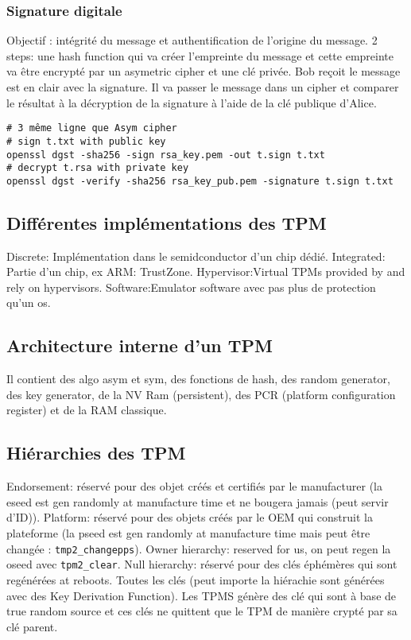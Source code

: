 \subsubsection{Signature digitale}
Objectif : intégrité du message et authentification de l'origine du message. 2 steps: une hash function qui va créer l'empreinte du message et cette empreinte va être encrypté par un asymetric cipher et une clé privée. Bob reçoit le message est en clair avec la signature. Il va passer le message dans un cipher et comparer le résultat à la décryption de la signature à l'aide de la clé publique d'Alice.
\begin{Verbatim}[breaklines=true, breakanywhere=true]
# 3 même ligne que Asym cipher
# sign t.txt with public key
openssl dgst -sha256 -sign rsa_key.pem -out t.sign t.txt
# decrypt t.rsa with private key
openssl dgst -verify -sha256 rsa_key_pub.pem -signature t.sign t.txt
\end{Verbatim}
\subsection{Différentes implémentations des TPM}
Discrete: Implémentation dans le semidconductor d'un chip dédié.
Integrated: Partie d'un chip, ex ARM: TrustZone.
Hypervisor:Virtual TPMs provided by and rely on hypervisors.
Software:Emulator software avec pas plus de protection qu'un os.
\subsection{Architecture interne d'un TPM}
Il contient des algo asym et sym, des fonctions de hash, des random generator, des key generator, de la NV Ram (persistent), des PCR (platform configuration register) et de la RAM classique.
\subsection{Hiérarchies des TPM}
Endorsement: réservé pour des objet créés et certifiés par le manufacturer (la eseed est gen randomly at manufacture time et ne bougera jamais (peut servir d'ID)). Platform: réservé pour des objets créés par le OEM qui construit la plateforme (la pseed est gen randomly at manufacture time mais peut être changée : \verb!tmp2_changepps!). Owner hierarchy: reserved for us, on peut regen la oseed avec \verb!tpm2_clear!. Null hierarchy: réservé pour des clés éphémères qui sont regénérées at reboots. Toutes les clés (peut importe la hiérachie sont générées avec des Key Derivation Function). Les TPMS génère des clé qui sont à base de true random source et ces clés ne quittent que le TPM de manière crypté par sa clé parent.

